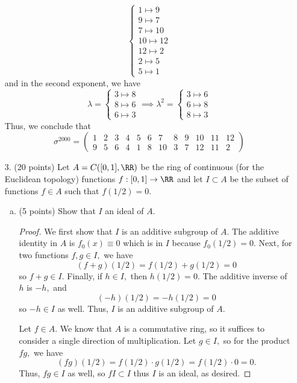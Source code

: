 \documentclass{article}
\begin{document}
\begin{itemize}
\begin{soln}
\[\begin{cases}
					1\mapsto 9 \\
					9\mapsto 7 \\
					7\mapsto 10 \\
					10\mapsto 12 \\
					12\mapsto 2 \\
					2\mapsto 5 \\
					5\mapsto 1
			\end{cases}\]
			and in the second exponent, we have
			\[\lambda=\begin{cases}
					3\mapsto 8 \\
					8\mapsto 6 \\
					6\mapsto 3
				\end{cases}\implies \lambda^2 = \begin{cases}
					3\mapsto 6 \\
					6\mapsto 8 \\
					8\mapsto 3
			\end{cases}\]
			Thus, we conclude that \[\sigma^{2000} = \begin{pmatrix}
					1 & 2 & 3 & 4 & 5 & 6 & 7 & 8 & 9 & 10 & 11 & 12 \\
					9 & 5 & 6 & 4 & 1 & 8 & 10 & 3 & 7 & 12 & 11 & 2
			\end{pmatrix}\]
		\end{soln}

		\newpage

	\item[3.] (20 points) Let $A=C([0, 1], \RR)$ be the ring of continuous (for the Euclidean topology) functions $f:[0, 1]\to\RR$ and let $I\subset A$ be the subset of functions $f\in A$ such that $f(1/2)=0.$
		\begin{enumerate}[(a)]
			\item (5 points) Show that $I$ an ideal of $A.$
				\begin{proof}
					We first show that $I$ is an additive subgroup of $A.$ The additive identity in $A$ is $f_0(x)\equiv0$ which is in $I$ because $f_0(1/2)=0.$ Next, for two functions $f, g\in I,$ we have
					\[(f+g)(1/2) = f(1/2) + g(1/2) = 0\]
					so $f+g\in I.$ Finally, if $h\in I,$ then $h(1/2)=0.$ The additive inverse of $h$ is $-h,$ and 
					\[(-h)(1/2)=-h(1/2)=0\]
					so $-h\in I$ as well. Thus, $I$ is an additive subgroup of $A.$

					Let $f\in A.$ We know that $A$ is a commutative ring, so it suffices to consider a single direction of multiplication. Let $g\in I,$ so for the product $fg,$ we have
					\[(fg)(1/2) = f(1/2)\cdot g(1/2) = f(1/2) \cdot 0 = 0.\]
					Thus, $fg\in I$ as well, so $fI\subset I$ thus $I$ is an ideal, as desired.
				\end{proof}


\end{enumerate}
\end{itemize}
\end{document}
